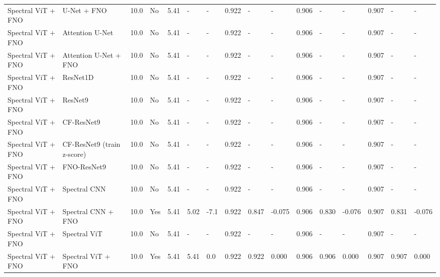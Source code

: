 \begin{longtable}{llllllllllllllll}
Spectral ViT + FNO & U-Net + FNO & 10.0 & No & 5.41 & - & - & 0.922 & - & - & 0.906 & - & - & 0.907 & - & - \\
Spectral ViT + FNO & Attention U-Net & 10.0 & No & 5.41 & - & - & 0.922 & - & - & 0.906 & - & - & 0.907 & - & - \\
Spectral ViT + FNO & Attention U-Net + FNO & 10.0 & No & 5.41 & - & - & 0.922 & - & - & 0.906 & - & - & 0.907 & - & - \\
Spectral ViT + FNO & ResNet1D & 10.0 & No & 5.41 & - & - & 0.922 & - & - & 0.906 & - & - & 0.907 & - & - \\
Spectral ViT + FNO & ResNet9 & 10.0 & No & 5.41 & - & - & 0.922 & - & - & 0.906 & - & - & 0.907 & - & - \\
Spectral ViT + FNO & CF-ResNet9 & 10.0 & No & 5.41 & - & - & 0.922 & - & - & 0.906 & - & - & 0.907 & - & - \\
Spectral ViT + FNO & CF-ResNet9 (train z-score) & 10.0 & No & 5.41 & - & - & 0.922 & - & - & 0.906 & - & - & 0.907 & - & - \\
Spectral ViT + FNO & FNO-ResNet9 & 10.0 & No & 5.41 & - & - & 0.922 & - & - & 0.906 & - & - & 0.907 & - & - \\
Spectral ViT + FNO & Spectral CNN & 10.0 & No & 5.41 & - & - & 0.922 & - & - & 0.906 & - & - & 0.907 & - & - \\
Spectral ViT + FNO & Spectral CNN + FNO & 10.0 & Yes & 5.41 & 5.02 & -7.1 & 0.922 & 0.847 & -0.075 & 0.906 & 0.830 & -0.076 & 0.907 & 0.831 & -0.076 \\
Spectral ViT + FNO & Spectral ViT & 10.0 & No & 5.41 & - & - & 0.922 & - & - & 0.906 & - & - & 0.907 & - & - \\
Spectral ViT + FNO & Spectral ViT + FNO & 10.0 & Yes & 5.41 & 5.41 & 0.0 & 0.922 & 0.922 & 0.000 & 0.906 & 0.906 & 0.000 & 0.907 & 0.907 & 0.000 \\
\end{longtable}
